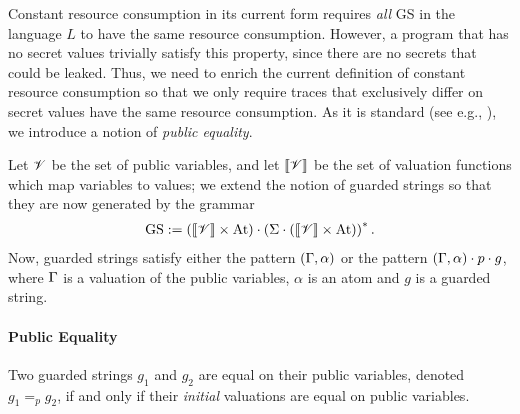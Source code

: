 Constant resource consumption in its current form requires \emph{all} GS in the language $L$ to have the same resource consumption. However, a program that has no secret values trivially satisfy this property, since there are no secrets that could be leaked. Thus, we need to enrich the current definition of constant resource consumption so that we only require traces that exclusively differ on secret values have the same resource consumption. As it is standard (see e.g., \cite{Molnar,usenix_ctp_verification}), we introduce a notion of \emph{public equality}. 

Let $\mathscr{V}$ be the set of public variables, and let $\llbracket \mathscr{V}\rrbracket$ be the set of valuation functions which map variables to values; we extend the notion of guarded strings so that they are now generated by the grammar
\begin{align*}
\text{GS} := \left(\llbracket \mathscr{V}\rrbracket\times\text{At}\right) \cdot \left(\Sigma\cdot \left(\llbracket \mathscr{V}\rrbracket\times\text{At}\right)\right)^{*}.
\end{align*}
Now, guarded strings satisfy either the pattern $(\Gamma,\alpha)$ or the pattern $(\Gamma,\alpha)\cdot p\cdot g$, where $\Gamma$ is a valuation of the public variables, $\alpha$ is an atom and $g$ is a guarded string.

\paragraph%
    {Public Equality}
Two guarded strings $g_1$ and $g_2$ are equal on their public variables, denoted $g_1=_p g_2$, if and only if their \emph{initial} valuations are equal on public variables. 

